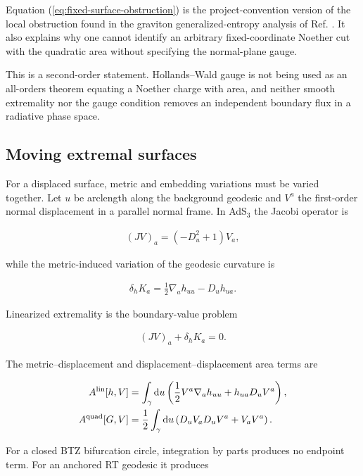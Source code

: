 Equation (\ref{eq:fixed-surface-obstruction}) is the project-convention version of the local obstruction found in the graviton generalized-entropy analysis of Ref. \cite{ColinEllerin:2025gravitons}. It also explains why one cannot identify an arbitrary fixed-coordinate Noether cut with the quadratic area without specifying the normal-plane gauge.

This is a second-order statement. Hollands--Wald gauge is not being used as an all-orders theorem equating a Noether charge with area, and neither smooth extremality nor the gauge condition removes an independent boundary flux in a radiative phase space.

\subsection{Moving extremal surfaces}\label{subsec:moving-extremal-surfaces}

For a displaced surface, metric and embedding variations must be varied together. Let $u$ be arclength along the background geodesic and $V^a$ the first-order normal displacement in a parallel normal frame. In AdS$_3$ the Jacobi operator is

\begin{align}
(JV)_a=(-D_u^2+1)V_a,
\end{align}

while the metric-induced variation of the geodesic curvature is

\begin{align}
\delta_hK_a
=\frac12\nabla_a h_{uu}-D_uh_{ua}.
\end{align}

Linearized extremality is the boundary-value problem

\begin{align}
(JV)_a+\delta_hK_a=0. \label{eq:jacobi}
\end{align}

The metric--displacement and displacement--displacement area terms are

\begin{align}
A^{\rm lin}[h,V]
&=\int_\gamma\mathrm du
\left(\frac12V^a\nabla_a h_{uu}+h_{ua}D_uV^a\right),\\
A^{\rm quad}[G,V]
&=\frac12\int_\gamma\mathrm du
\left(D_uV_aD_uV^a+V_aV^a\right). \label{eq:area-displacement}
\end{align}

For a closed BTZ bifurcation circle, integration by parts produces no endpoint term. For an anchored RT geodesic it produces

